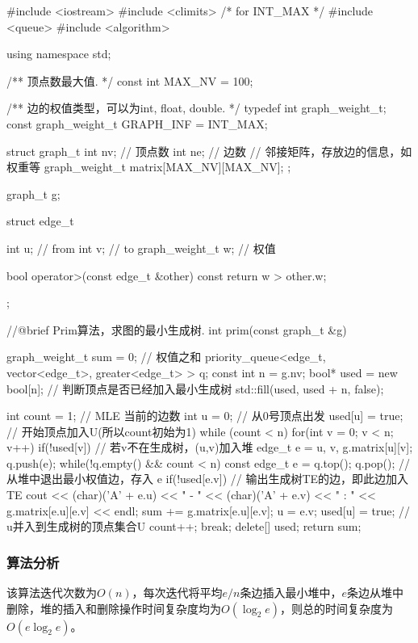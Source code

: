 \begin{Codex}[label=am_graph_prim2.cpp]
    #include <iostream>
    #include <climits>  /* for INT_MAX */
    #include <queue>
    #include <algorithm>

    using namespace std;

    /** 顶点数最大值. */
    const int MAX_NV = 100;

    /** 边的权值类型，可以为int, float, double. */
    typedef int graph_weight_t;
    const graph_weight_t GRAPH_INF = INT_MAX;

    struct graph_t {
        int nv; // 顶点数
        int ne; // 边数
        // 邻接矩阵，存放边的信息，如权重等
        graph_weight_t matrix[MAX_NV][MAX_NV];
    };

    graph_t g;

    struct edge_t{
        int u;  // from
        int v;  // to
        graph_weight_t w;  // 权值

        bool operator>(const edge_t &other) const {
            return w > other.w;
        }
    };

    //@brief Prim算法，求图的最小生成树.
    int prim(const graph_t &g){
        graph_weight_t sum = 0; // 权值之和
        priority_queue<edge_t, vector<edge_t>, greater<edge_t> > q;
        const int n = g.nv;
        bool* used = new bool[n];  // 判断顶点是否已经加入最小生成树
        std::fill(used, used + n, false);

        int count = 1;  // MLE 当前的边数
        int u = 0;      // 从0号顶点出发
        used[u] = true;    // 开始顶点加入U(所以count初始为1)
        while (count < n) {
            for(int v = 0; v < n; v++) if(!used[v]) { // 若v不在生成树，(u,v)加入堆
                edge_t e = {u, v, g.matrix[u][v]};
                q.push(e);
            }
            while(!q.empty() && count < n) {
                const edge_t e = q.top(); q.pop();  // 从堆中退出最小权值边，存入 e
                if(!used[e.v]) {
                    // 输出生成树TE的边，即此边加入TE
                    cout << (char)('A' + e.u) << " - " << (char)('A' + e.v) <<
                            " : " << g.matrix[e.u][e.v] << endl;
                    sum += g.matrix[e.u][e.v];
                    u = e.v;
                    used[u] = true; // u并入到生成树的顶点集合U
                    count++;
                    break;
                }
            }
        }
        delete[] used;
        return sum;
    }
\end{Codex}

\subsubsection{算法分析}
该算法迭代次数为$O(n)$，每次迭代将平均$e/n$条边插入最小堆中，$e$条边从堆中删除，堆的插入和删除操作时间复杂度均为$O(\log_2 e)$，则总的时间复杂度为 $O(e\log_2e)$。


